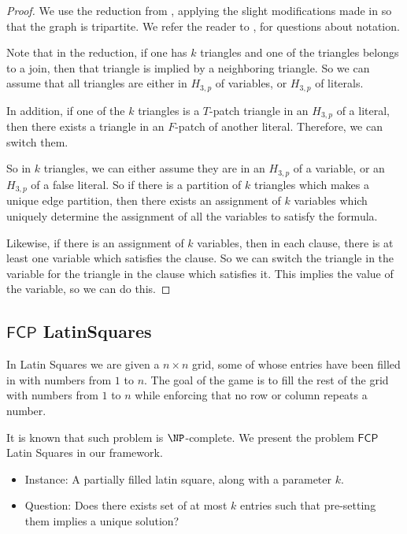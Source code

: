 \documentclass[runningheads,a4paper]{llncs}
\begin{document}
\begin{proof}
We use the reduction from \cite{holyer1981np}, applying the slight modifications made in \cite{colbourn1984complexity} so that the graph is tripartite. We refer the reader to \cite{holyer1981np}, \cite{colbourn1984complexity} for questions about notation.

Note that in the reduction, if one has $k$ triangles and one of the triangles belongs to a join, then that triangle is implied by a neighboring triangle. So we can assume that all triangles are either in $H_{3,p}$ of variables, or $H_{3,p}$ of literals. 

In addition, if one of the $k$ triangles is a $T$-patch triangle in an $H_{3,p}$ of a literal, then there exists a triangle in an $F$-patch of another literal. Therefore, we can switch them.

So in $k$ triangles, we can either assume they are in an $H_{3,p}$ of a variable, or an $H_{3,p}$ of a false literal. So if there is a partition of $k$ triangles which makes a unique edge partition, then there exists an assignment of $k$ variables which uniquely determine the assignment of all the variables to satisfy the formula. 

Likewise, if there is an assignment of $k$ variables, then in each clause, there is at least one variable which satisfies the clause. So we can switch the triangle in the variable for the triangle in the clause which satisfies it. This implies the value of the variable, so we can do this.
\end{proof}

\subsection{$\mathsf{FCP}$ LatinSquares}

In Latin Squares we are given a $n \times n$ grid, some of whose entries have been filled in with numbers from $1$ to $n$. The goal of the game is to fill the rest of the grid with numbers from $1$ to $n$ while enforcing that no row or column repeats a number. 

It is known that such problem is $\NP$-complete. We present the problem $\mathsf{FCP}$ Latin Squares in our framework.

\begin{itemize}
\item Instance: A partially filled latin square, along with a parameter $k$. 
\item Question: Does there exists set of at most $k$ entries such that pre-setting them implies a unique solution?
\end{itemize}
\end{document}
